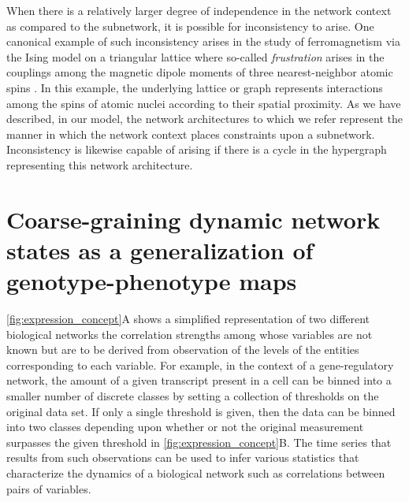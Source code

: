 When there is a relatively larger degree of independence in the network context as compared to the subnetwork, it is possible for inconsistency to arise. One canonical example of such inconsistency arises in the study of ferromagnetism via the Ising model on a triangular lattice where so-called \emph{frustration} arises in the couplings among the magnetic dipole moments of three nearest-neighbor atomic spins \cite{Wannier1950,Toulouse1977,Vannimenus1977}. In this example, the underlying lattice or graph represents interactions among the spins of atomic nuclei according to their spatial proximity. As we have described, in our model, the network architectures to which we refer represent the manner in which the network context places constraints upon a subnetwork. Inconsistency is likewise capable of arising if there is a cycle in the hypergraph representing this network architecture.

\section{Coarse-graining dynamic network states as a generalization of genotype-phenotype maps}\label{sec:genenetworkphenmap}

\autoref{fig:expression_concept}A shows a simplified representation of two different biological networks the correlation strengths among whose variables are not known but are to be derived from observation of the levels of the entities corresponding to each variable. For example, in the context of a gene-regulatory network, the amount of a given transcript present in a cell can be binned into a smaller number of discrete classes by setting a collection of thresholds on the original data set. If only a single threshold is given, then the data can be binned into two classes depending upon whether or not the original measurement surpasses the given threshold in \autoref{fig:expression_concept}B.
The time series that results from such observations can be used to infer various statistics that characterize the dynamics of a biological network such as correlations between pairs of variables.

